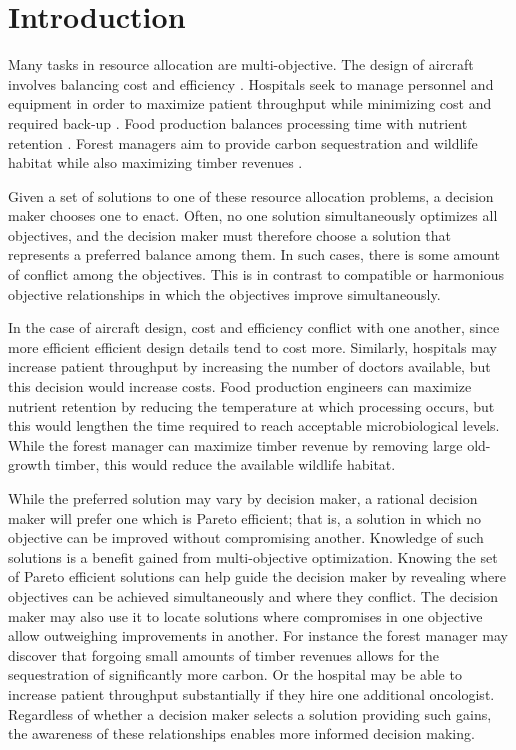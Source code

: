 
\section{Introduction}
\label{sec:intro}

Many tasks in resource allocation are multi-objective. The design of aircraft involves balancing cost and efficiency \cite{wang2014multi}. Hospitals seek to manage personnel and equipment in order to maximize patient throughput while minimizing cost and required back-up \cite{hutzschenreuter2009evolutionary}. Food production balances processing time with nutrient retention \cite{sendin2010efficient}. Forest managers aim to provide carbon sequestration and wildlife habitat while also maximizing timber revenues \cite{toth2013ecosel}.

Given a set of solutions to one of these resource allocation problems, a decision maker chooses one to enact. Often, no one solution simultaneously optimizes all objectives, and the decision maker must therefore choose a solution that represents a preferred balance among them. In such cases, there is some amount of conflict among the objectives. This is in contrast to compatible or harmonious objective relationships in which the objectives improve simultaneously.

In the case of aircraft design, cost and efficiency conflict with one another, since more efficient efficient design details tend to cost more. Similarly, hospitals may increase patient throughput by increasing the number of doctors available, but this decision would increase costs. Food production engineers can maximize nutrient retention by reducing the temperature at which processing occurs, but this would lengthen the time required to reach acceptable microbiological levels. While the forest manager can maximize timber revenue by removing large old-growth timber, this would reduce the available wildlife habitat.

While the preferred solution may vary by decision maker, a rational decision maker will prefer one which is Pareto efficient; that is, a solution in which no objective can be improved without compromising another. Knowledge of such solutions is a benefit gained from multi-objective optimization. Knowing the set of Pareto efficient solutions can help guide the decision maker by revealing where objectives can be achieved simultaneously and where they conflict. The decision maker may also use it to locate solutions where compromises in one objective allow outweighing improvements in another. For instance the forest manager may discover that forgoing small amounts of timber revenues allows for the sequestration of significantly more carbon. Or the hospital may be able to increase patient throughput substantially if they hire one additional oncologist.
Regardless of whether a decision maker selects a solution providing such gains, the awareness of these relationships enables more informed decision making.

